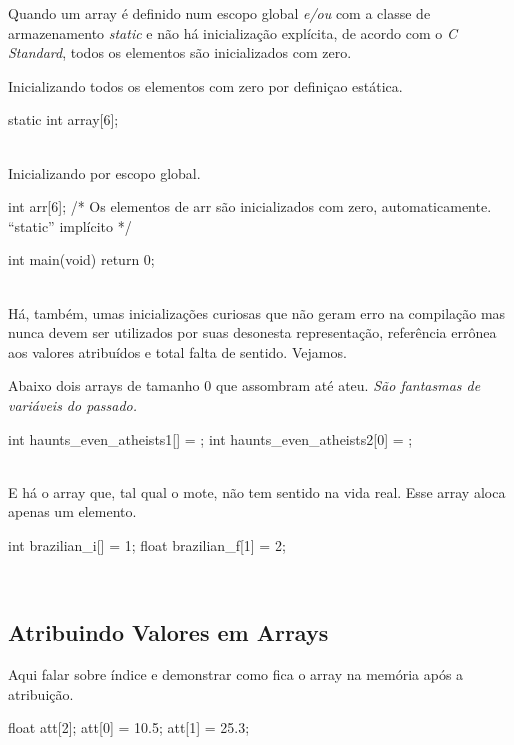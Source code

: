 Quando um array é definido num escopo global \textit{e/ou} com a classe de armazenamento \textit{static} e não há inicialização explícita, de acordo com o \textit{C Standard}, todos os elementos são inicializados com zero.

Inicializando todos os elementos com zero por definiçao estática.

\begin{ccode}
  static int array[6];
\end{ccode}
\\

Inicializando por escopo global.

\begin{ccode}
int arr[6];    /* Os elementos de arr são inicializados
                  com zero, automaticamente.
                  ``static'' implícito */

int main(void)
{
  return 0;
}
\end{ccode}
\\

Há, também, umas inicializações curiosas que não geram erro na compilação mas nunca devem ser utilizados por suas desonesta representação, referência errônea aos valores atribuídos e total falta de sentido. Vejamos.

Abaixo dois arrays  de tamanho 0 que assombram até ateu. \textit{São fantasmas de variáveis do passado.}

\begin{ccode}
  int haunts_even_atheists1[] = {};
  int haunts_even_atheists2[0] = {};
\end{ccode}
\\

E há o array  que, tal qual o mote, não tem sentido na vida real. Esse array aloca apenas um elemento.

\begin{ccode}
  int brazilian_i[] = {1};
  float brazilian_f[1] = {2};
\end{ccode}
\\

\subsection{Atribuindo Valores em Arrays}
Aqui falar sobre índice e demonstrar como fica o array na memória após a atribuição.

\begin{ccode}
  float att[2];
  att[0] = 10.5;
  att[1] = 25.3;
\end{ccode}

